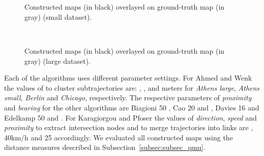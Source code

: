 \documentclass[natbib]{svjour3}                    \smartqed  \usepackage[table]{xcolor}
\begin{document}
\begin{figure}[htbp]
 \begin{center}
	 \\
\\	 
	 
	 \end{center}
\caption{Constructed maps (in black) overlayed on ground-truth map (in gray) (small dataset).}
\label{fig:rn_alls}
\end{figure}
	 
\begin{figure}[htbp]
 \begin{center}	
	 \\
	 \end{center}
\caption{Constructed maps (in black) overlayed on ground-truth map (in gray)  (large dataset).}
\label{fig:rn_allb}
\end{figure}

Each of the algorithms uses different parameter settings.
For Ahmed and Wenk \cite{csm_esa2012} the values of  to cluster subtrajectories are: , ,  and  meters for \emph{Athens large}, \emph{Athens small}, \emph{Berlin} and \emph{Chicago}, respectively. 
The respective parameters of \emph{proximity} and \emph{bearing} for the other algorithms are Biagioni 50 \cite{Biagioni:2012:MIF:2424321.2424333}, Cao 20 and  \cite{Cao:2009:GTR:1653771.1653776}, Davies 16 \cite{Davies:2006:SDR:1175887.1176088} and Edelkamp 50 and  \cite{edelkamp:2003:rpmi}. 
For Karagiorgou and Pfoser \cite{Karagiorgou:2012:VTD:2424321.2424334} the values of \emph{direction}, \emph{speed} and \emph{proximity} to extract intersection nodes and to merge trajectories into links are , 40km/h and 25 accordingly. We evaluated all constructed maps using the distance measures described in Subsection~\ref{subsec:subsec_qmu}.
 
\end{document}
